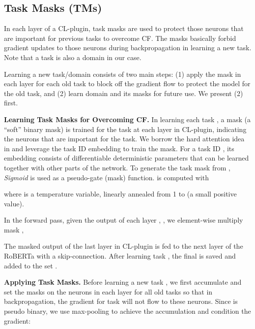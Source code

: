 \documentclass[11pt]{article}
\begin{document}
\subsection{Task Masks (TMs)} 
\label{sec:task_mask}






In each layer of a CL-plugin, task masks are used to protect those neurons that are important for previous tasks to overcome CF. The masks basically forbid gradient updates to those neurons during backpropagation in learning a new task. Note that a task is also a domain in our case.

Learning a new task/domain consists of two main steps: (1) apply the mask in each layer for each old task to block off the gradient flow to protect the model for the old task, and (2) learn domain  and its masks for future use. We present (2) first.  
 











\textbf{Learning Task Masks for Overcoming CF.} In learning each task , a mask (a ``soft'' binary mask)  is trained for the task at each layer  in CL-plugin, indicating the neurons that are important for the task. We borrow the hard attention idea in \cite{Serra2018overcoming} and leverage the task ID embedding to train the mask. For a task ID , its embedding  consists of differentiable deterministic parameters that can be learned together with other parts of the network. 
To generate the task mask  from , \textit{Sigmoid} is used as a pseudo-gate (mask) function.  is computed with

where  is a temperature variable, linearly annealed from 1 to  (a small positive value). 

In the forward pass, given the output of each layer , , we element-wise multiply mask ,

{The masked output  of the last layer in CL-plugin is} fed to the next layer of the RoBERTa with a skip-connection. After learning task , the final  is saved and added to the set .

\textbf{Applying Task Masks.}
Before learning a new task , we first accumulate and set the masks  on the neurons in each layer  for all old tasks 
so that in backpropagation, the gradient  for task  will not flow to these neurons. 
Since  is {pseudo} binary, we use 
max-pooling to achieve the accumulation and condition the gradient:  
\end{document}

